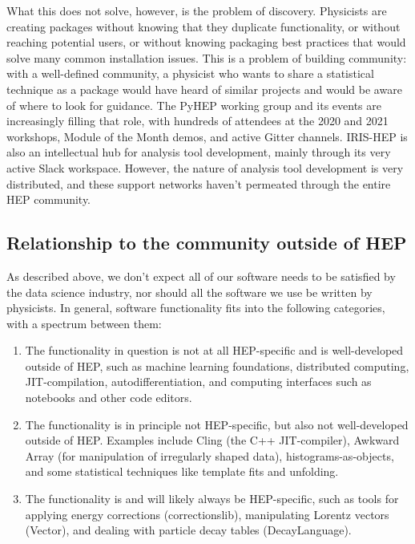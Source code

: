 \documentclass{article}
\begin{document}
What this does not solve, however, is the problem of discovery. Physicists are creating packages without knowing that they duplicate functionality, or without reaching potential users, or without knowing packaging best practices that would solve many common installation issues. This is a problem of building community: with a well-defined community, a physicist who wants to share a statistical technique as a package would have heard of similar projects and would be aware of where to look for guidance. The PyHEP working group and its events are increasingly filling that role, with hundreds of attendees at the 2020 and 2021 workshops, Module of the Month demos, and active Gitter channels. IRIS-HEP is also an intellectual hub for analysis tool development, mainly through its very active Slack workspace. However, the nature of analysis tool development is very distributed, and these support networks haven't permeated through the entire HEP community.

\subsection{Relationship to the community outside of HEP}

As described above, we don't expect all of our software needs to be satisfied by the data science industry, nor should all the software we use be written by physicists. In general, software functionality fits into the following categories, with a spectrum between them:

\begin{enumerate}
\item The functionality in question is not at all HEP-specific and is well-developed outside of HEP, such as machine learning foundations, distributed computing, JIT-compilation, autodifferentiation, and computing interfaces such as notebooks and other code editors.

\item The functionality is in principle not HEP-specific, but also not well-developed outside of HEP. Examples include Cling (the C++ JIT-compiler), Awkward Array (for manipulation of irregularly shaped data), histograms-as-objects, and some statistical techniques like template fits and unfolding.

\item The functionality is and will likely always be HEP-specific, such as tools for applying energy corrections (correctionslib), manipulating Lorentz vectors (Vector), and dealing with particle decay tables (DecayLanguage).
\end{enumerate}
\end{document}

